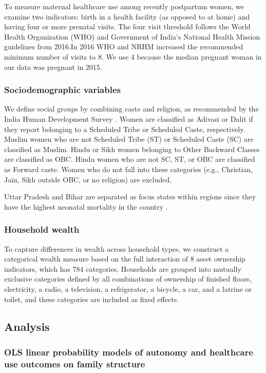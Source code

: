 \documentclass[12pt]{article}
\begin{document}
To measure maternal healthcare use among recently postpartum women, we examine two indicators: birth in a health facility (as opposed to at home) and having four or more prenatal visits. The four visit threshold follows the World Health Organization (WHO) and Government of India’s National Health Mission guidelines from 2016.In 2016 WHO and NRHM increased the recommended minimum number of visits to 8.  We use 4 because the median pregnant woman in our data was pregnant in 2015.

\subsubsection*{Sociodemographic variables}  

We define social groups by combining caste and religion, as recommended by the India Human Development Survey \citep{desai2008india}. Women are classified as Adivasi or Dalit if they report belonging to a Scheduled Tribe or Scheduled Caste, respectively. Muslim women who are not Scheduled Tribe (ST) or Scheduled Caste (SC) are classified as Muslim. Hindu or Sikh women belonging to Other Backward Classes are classified as OBC. Hindu women who are not SC, ST, or OBC are classified as Forward caste. Women who do not fall into these categories (e.g., Christian, Jain, Sikh outside OBC, or no religion) are excluded. 

Uttar Pradesh and Bihar are separated as focus states within regions since they have the highest neonatal mortality in the country \citep{coffey2025excess}. 

\subsubsection*{Household wealth} \label{sec:wealthcontrols}

To capture differences in wealth across household types, we construct a categorical wealth measure based on the full interaction of 8 asset ownership indicators, which has 784 categories. Households are grouped into mutually exclusive categories defined by all combinations of ownership of finished floors, electricity, a radio, a television, a refrigerator, a bicycle, a car, and a latrine or toilet, and these categories are included as fixed effects.

\subsection*{Analysis}
\subsubsection*{OLS linear probability models of autonomy and healthcare use outcomes on family structure}
\end{document}
